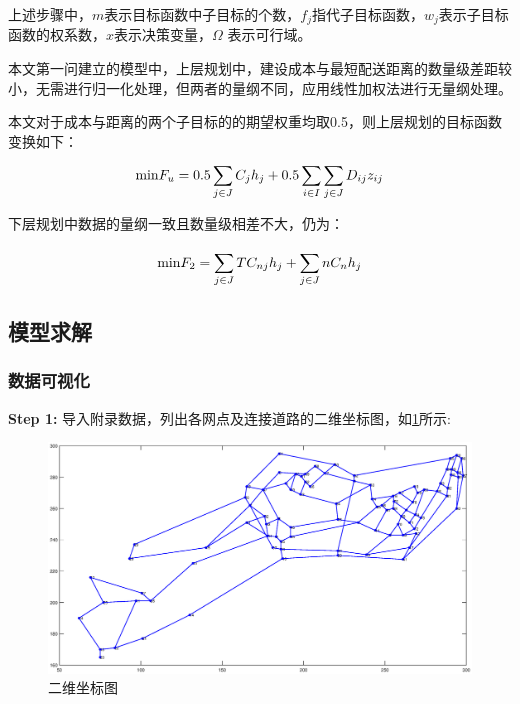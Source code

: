 \documentclass[withoutpreface,bwprint]{cumcmthesis} %
\begin{document}
上述步骤中，$m$表示目标函数中子目标的个数，$f_j$指代子目标函数，$w_j$表示子目标函数的权系数，$x$表示决策变量，$ \Omega $ 表示可行域。

本文第一问建立的模型中，上层规划中，建设成本与最短配送距离的数量级差距较小，无需进行归一化处理，但两者的量纲不同，应用线性加权法进行无量纲处理。
	
	本文对于成本与距离的两个子目标的的期望权重均取0.5，则上层规划的目标函数变换如下：
	\begin{align*}
		{\rm{min }}{F_u} = 0.5\sum\limits_{j \in J}^{} {{C_{j}}} {h_j} + 0.5\sum\limits_{i \in I}^{} {\sum\limits_{j \in J}^{} {{D_{ij}}} } {z_{ij}}
	\end{align*}
	
	下层规划中数据的量纲一致且数量级相差不大，仍为：
	
	\begin{align*}
		{\rm{min }}{F_2} = \sum\limits_{j \in J}^{} {T{C_{nj}}} {h_j} + \sum\limits_{j \in J}^{} {n{C_n}} {h_j}
	\end{align*}
	
	\subsection{模型求解}
	\subsubsection{数据可视化}

\textbf{Step 1: }导入附录数据，列出各网点及连接道路的二维坐标图，如\ref{fig:二维坐标图}所示:
	\begin{figure}[htbp]
		\centering
		\includegraphics[width=16cm]{raw_real_G.eps}
		\caption{二维坐标图}
		\label{fig:二维坐标图}
	\end{figure}
\end{document}
